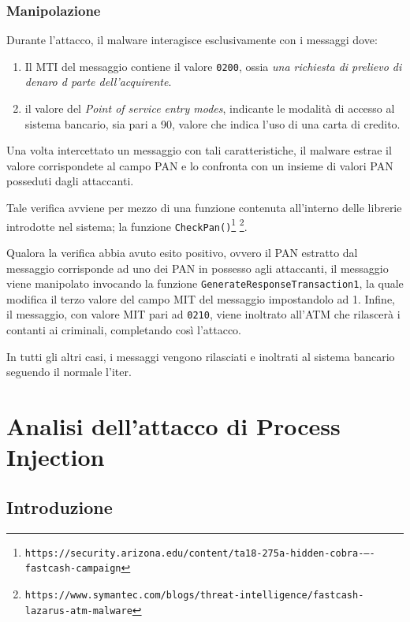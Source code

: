 \documentclass[10pt,a4paper, titlepage]{report}
\begin{document}
\subsection{Manipolazione}

Durante l'attacco, il malware interagisce esclusivamente con i messaggi dove:
\begin{enumerate}
\item Il MTI del messaggio contiene il valore \texttt{0200}, ossia \textit{una richiesta di prelievo di denaro d parte dell'acquirente}.
\item il valore del \textit{Point of service entry modes}, indicante le modalità di accesso al sistema bancario, sia pari a 90, valore che indica l'uso di una carta di credito.
\end{enumerate}

Una volta intercettato un messaggio con tali caratteristiche, il malware estrae il valore corrispondete al campo PAN e lo confronta con un insieme di valori PAN posseduti dagli attaccanti. 

Tale verifica avviene per mezzo di una funzione contenuta all'interno delle librerie introdotte nel sistema; la funzione \texttt{CheckPan()}\footnote{\texttt{https://security.arizona.edu/content/ta18-275a-hidden-cobra-–-fastcash-campaign}} \footnote{\texttt{https://www.symantec.com/blogs/threat-intelligence/fastcash-lazarus-atm-malware}}.

Qualora la verifica abbia avuto esito positivo, ovvero il PAN estratto dal messaggio corrisponde ad uno dei PAN in possesso agli attaccanti, il messaggio viene manipolato invocando la funzione \texttt{GenerateResponseTransaction1}, la quale modifica il terzo valore del campo MIT del messaggio impostandolo ad 1. Infine, il messaggio, con valore MIT pari ad \texttt{0210}, viene inoltrato all'ATM che rilascerà i contanti ai criminali, completando così l'attacco.

In tutti gli altri casi, i messaggi vengono rilasciati e inoltrati al sistema bancario seguendo il normale l'iter.

\newpage
\chapter{Analisi dell'attacco di Process Injection}

\section{Introduzione}
\end{document}
